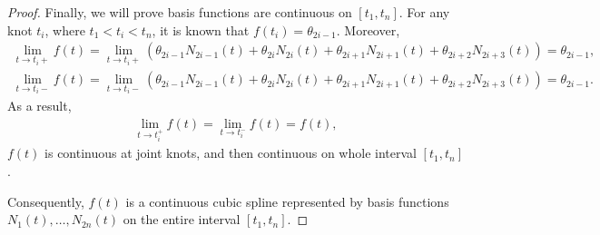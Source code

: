 \begin{proof}
Finally, we will prove basis functions are continuous on $[t_1, t_n]$. For any knot $t_i$, where $t_1< t_i <t_n$, it is known that $f(t_i)=\theta_{2i-1}$. Moreover, 
\begin{align*}
\lim\limits_{t\rightarrow t_i+} f(t) = \lim\limits_{t\rightarrow t_i+} (\theta_{2i-1}N_{2i-1}(t)+\theta_{2i}N_{2i}(t)+\theta_{2i+1}N_{2i+1}(t)+\theta_{2i+2}N_{2i+3}(t))=\theta_{2i-1},\\
\lim\limits_{t\rightarrow t_i-} f(t) = \lim\limits_{t\rightarrow t_i-} (\theta_{2i-1}N_{2i-1}(t)+\theta_{2i}N_{2i}(t)+\theta_{2i+1}N_{2i+1}(t)+\theta_{2i+2}N_{2i+3}(t))=\theta_{2i-1}.
\end{align*}
As a result, 
\begin{align*}
\lim\limits_{t\rightarrow t_i^+} f(t) =\lim\limits_{t\rightarrow t_i^-} f(t) =f(t),
\end{align*}
$f(t)$ is continuous at joint knots, and then continuous on whole interval $[t_1,t_n]$.

Consequently, $f(t)$ is a continuous cubic spline represented by basis functions $N_1(t),\ldots,N_{2n}(t)$ on the entire interval $[t_1,t_n]$. 
\end{proof}


